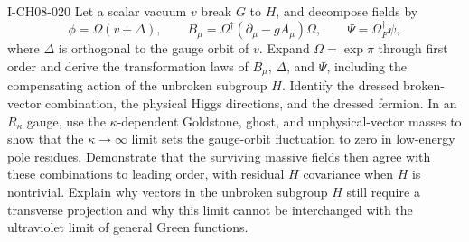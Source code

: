 \begin{exercise}{I-CH08-020}
Let a scalar vacuum $v$ break $G$ to $H$, and decompose fields by
\[
 \phi=\Omega(v+\Delta),\qquad
 B_\mu=\Omega^\dagger(\partial_\mu-gA_\mu)\Omega,
 \qquad \Psi=\Omega_F^\dagger\psi,
\]
where $\Delta$ is orthogonal to the gauge orbit of $v$.  Expand
$\Omega=\exp\pi$ through first order and derive the transformation laws of
$B_\mu$, $\Delta$, and $\Psi$, including the compensating action of the
unbroken subgroup $H$.
Identify the dressed broken-vector combination, the physical Higgs
directions, and the dressed fermion.  In an $R_\kappa$ gauge, use the
$\kappa$-dependent Goldstone, ghost, and unphysical-vector masses to show that
the $\kappa\to\infty$ limit sets the gauge-orbit fluctuation to zero in
low-energy pole residues.  Demonstrate that the surviving massive fields
then agree with these combinations to leading order, with residual
$H$ covariance when $H$ is nontrivial.
Explain why vectors in the unbroken subgroup $H$ still require a transverse
projection and why this limit cannot be interchanged with the ultraviolet
limit of general Green functions.
\end{exercise}
